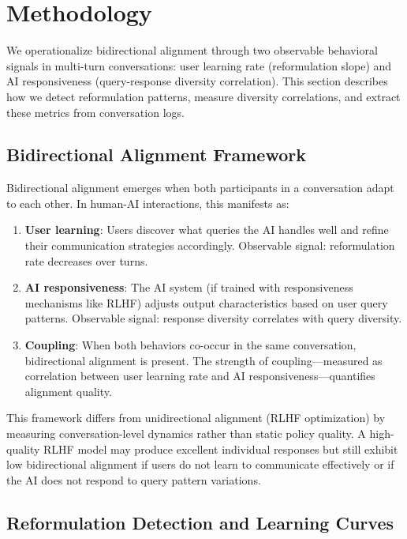 \section{Methodology}
\label{sec:methodology}

We operationalize bidirectional alignment through two observable behavioral signals in multi-turn conversations: user learning rate (reformulation slope) and AI responsiveness (query-response diversity correlation). This section describes how we detect reformulation patterns, measure diversity correlations, and extract these metrics from conversation logs.

\subsection{Bidirectional Alignment Framework}

Bidirectional alignment emerges when both participants in a conversation adapt to each other. In human-AI interactions, this manifests as:

\begin{enumerate}
\item \textbf{User learning}: Users discover what queries the AI handles well and refine their communication strategies accordingly. Observable signal: reformulation rate decreases over turns.

\item \textbf{AI responsiveness}: The AI system (if trained with responsiveness mechanisms like RLHF) adjusts output characteristics based on user query patterns. Observable signal: response diversity correlates with query diversity.

\item \textbf{Coupling}: When both behaviors co-occur in the same conversation, bidirectional alignment is present. The strength of coupling---measured as correlation between user learning rate and AI responsiveness---quantifies alignment quality.
\end{enumerate}

This framework differs from unidirectional alignment (RLHF optimization) by measuring conversation-level dynamics rather than static policy quality. A high-quality RLHF model may produce excellent individual responses but still exhibit low bidirectional alignment if users do not learn to communicate effectively or if the AI does not respond to query pattern variations.

\subsection{Reformulation Detection and Learning Curves}

